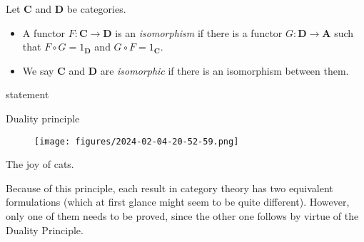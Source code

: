 \begin{definition}[Isomorphism]
    
\end{definition}



\begin{definition}
    Let \(\mathbf{C}\) and \(\mathbf{D}\) be categories.
    \begin{itemize}[]
        \item A functor \(F\colon \mathbf{C}\to \mathbf{D}\) is an \textit{isomorphism} if there is a functor \(G\colon \mathbf{D}\to \mathbf{A}\) such that \(F\circ G = 1_{\mathbf{D}}\) and \(G\circ F = 1_{\mathbf{C}}\).
        \item We say \(\mathbf{C}\) and \(\mathbf{D}\) are \textit{isomorphic} if there is an isomorphism between them.
    \end{itemize}
\end{definition}


\begin{theorem}[on isomorphisms]
    statement
\end{theorem}


\begin{definition}
    
\end{definition}

\begin{definition}
    
\end{definition}


\begin{definition}
    
\end{definition}



    


Duality principle

\begin{figure}[!htb]
    \centering
    \texttt{[image: figures/2024-02-04-20-52-59.png]}
    \caption{}%
\end{figure}

The joy of cats.

Because of this principle, each result in category theory has two equivalent formulations
(which at first glance might seem to be quite different). However, only one of them needs
to be proved, since the other one follows by virtue of the Duality Principle.